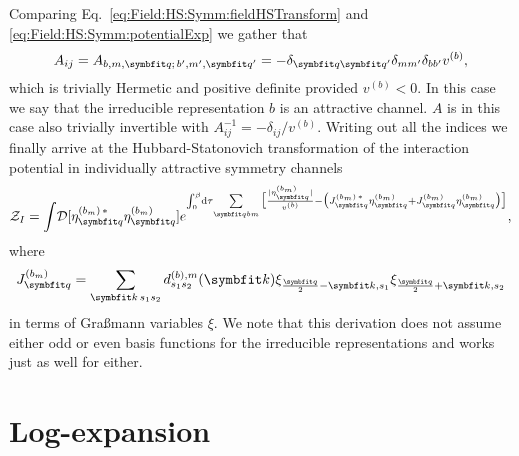 Comparing Eq.~\eqref{eq:Field:HS:Symm:fieldHSTransform} and \eqref{eq:Field:HS:Symm:potentialExp} we gather that
\begin{equation}
    \label{eq:Field:HS:Symm:Matrix}
    A_{ij} = A_{b,m,\v{q};\,b',m',\v{q}'} = -\delta_{\v{q}\v{q}'}\delta_{mm'}\delta_{bb'}v^{(b)},
\end{equation}
which is trivially Hermetic and positive definite provided $v^{(b)}<0$. In this case we say that the irreducible representation $b$ is an
attractive channel. $A$ is in this case also trivially invertible with $A_{ij}^{-1} = -\delta_{ij}/v^{(b)}$.
Writing out all the indices we finally arrive at the Hubbard-Statonovich transformation of the interaction potential in individually
attractive symmetry channels
\begin{equation}
    \label{eq:Field:HS:Symm:HSTransformedPotentialExp}
    \mathcal{Z}_I = \int\!\mathcal{D}[\eta_\v{q}^{(b_m)\,\ast}\eta_\v{q}^{(b_m)}]e^{\int_0^\beta\!\mathrm{d}\tau\!\sum\limits_{\v{q}bm}\big[\frac{|\eta_\v{q}^{(b_m)}|}{v^{(b)}} - \big(J_\v{q}^{(b_m)\,\ast}\eta_\v{q}^{(b_m)} + J_\v{q}^{(b_m)}\eta_\v{q}^{(b_m)}\big)\big]},
\end{equation}
where
\begin{equation}
    \label{eq:Field:HS:Symm:JRedef}
    J^{(b_m)}_\v{q} = \sum_{\v{k}\,s_1s_2}d_{s_1s_2}^{(b),m}(\v{k})\xi_{\frac{\v{q}}{2}-\v{k},s_1}\xi_{\frac{\v{q}}{2}+\v{k},s_2}
\end{equation}
in terms of Gra\ss mann variables $\xi$. We note that this derivation does not assume either odd or even basis functions for the
irreducible representations and works just as well for either.

\section{Log-expansion}
